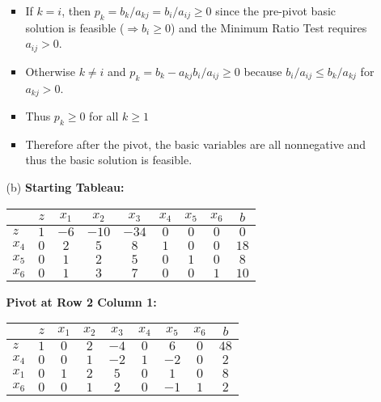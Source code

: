 \documentclass{article}[12pt,a4paper]
\begin{document}
\begin{enumerate}
\begin{enumerate}
\begin{itemize}
  \item If $k = i$, then $p_k = b_k/a_{kj} = b_i/a_{ij} \ge 0$ since the pre-pivot basic solution is feasible 
  ($\Rightarrow b_i \ge 0$) and the Minimum Ratio Test requires $a_{ij} > 0$. 
  \item Otherwise $k \ne i$ and $p_k = b_k - a_{kj}b_i/a_{ij} \ge 0$ because $b_i/a_{ij} \le b_k/a_{kj}$
  for $a_{kj} > 0$.
  \item Thus $p_k \ge 0$ for all $k \ge 1$
  \item Therefore after the pivot, the basic variables are all nonnegative and thus the basic solution is feasible. \newline{}
  \end{itemize} 
  
  \item[(b)] 
   \textbf{Starting Tableau:}
   \begin{center}
   \begin{tabular}{l | c c c c c c c | c}
             & $z$ & $x_1$ & $x_2$ & $x_3$ & $x_4$ & $x_5$ & $x_6$ & $b$ \\ \hline
   $z$     & $1$ & $-6$   & $-10$ & $-34$  & $0$     & $0$     & $0$     & $0$ \\ \hline
   $x_4$ & $0$ & $2$    & $5$    & $8$      & $1$     & $0$     & $0$     & $18$ \\
   $x_5$ & $0$ & $1$    & $2$    & $5$      & $0$     & $1$     & $0$     & $8$ \\
   $x_6$ & $0$ & $1$    & $3$    & $7$      & $0$     & $0$     & $1$     & $10$ \\
   \end{tabular}
   \end{center}
   
   \textbf{Pivot at Row 2 Column 1:}
    \begin{center}
    \begin{tabular}{l | c c c c c c c | c}
             & $z$ & $x_1$ & $x_2$ & $x_3$ & $x_4$ & $x_5$ & $x_6$ & $b$ \\ \hline
   $z$     & $1$ & $0$   & $2$ & $-4$  & $0$     & $6$     & $0$     & $48$ \\ \hline
   $x_4$ & $0$ & $0$    & $1$    & $-2$      & $1$     & $-2$     & $0$     & $2$ \\
   $x_1$ & $0$ & $1$    & $2$    & $5$      & $0$     & $1$     & $0$     & $8$ \\
   $x_6$ & $0$ & $0$    & $1$    & $2$      & $0$     & $-1$     & $1$     & $2$ \\
   \end{tabular}
   \end{center}
   

\end{enumerate}
\end{enumerate}
\end{document}
